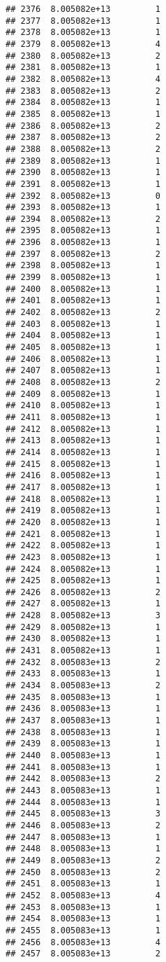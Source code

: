 \documentclass[
]{article}
\begin{document}
\begin{verbatim}
## 2376  8.005082e+13         1
## 2377  8.005082e+13         1
## 2378  8.005082e+13         1
## 2379  8.005082e+13         4
## 2380  8.005082e+13         2
## 2381  8.005082e+13         1
## 2382  8.005082e+13         4
## 2383  8.005082e+13         2
## 2384  8.005082e+13         1
## 2385  8.005082e+13         1
## 2386  8.005082e+13         2
## 2387  8.005082e+13         2
## 2388  8.005082e+13         2
## 2389  8.005082e+13         1
## 2390  8.005082e+13         1
## 2391  8.005082e+13         1
## 2392  8.005082e+13         0
## 2393  8.005082e+13         1
## 2394  8.005082e+13         2
## 2395  8.005082e+13         1
## 2396  8.005082e+13         1
## 2397  8.005082e+13         2
## 2398  8.005082e+13         1
## 2399  8.005082e+13         1
## 2400  8.005082e+13         1
## 2401  8.005082e+13         1
## 2402  8.005082e+13         2
## 2403  8.005082e+13         1
## 2404  8.005082e+13         1
## 2405  8.005082e+13         1
## 2406  8.005082e+13         1
## 2407  8.005082e+13         1
## 2408  8.005082e+13         2
## 2409  8.005082e+13         1
## 2410  8.005082e+13         1
## 2411  8.005082e+13         1
## 2412  8.005082e+13         1
## 2413  8.005082e+13         1
## 2414  8.005082e+13         1
## 2415  8.005082e+13         1
## 2416  8.005082e+13         1
## 2417  8.005082e+13         1
## 2418  8.005082e+13         1
## 2419  8.005082e+13         1
## 2420  8.005082e+13         1
## 2421  8.005082e+13         1
## 2422  8.005082e+13         1
## 2423  8.005082e+13         1
## 2424  8.005082e+13         1
## 2425  8.005082e+13         1
## 2426  8.005082e+13         2
## 2427  8.005082e+13         1
## 2428  8.005082e+13         3
## 2429  8.005082e+13         1
## 2430  8.005082e+13         1
## 2431  8.005082e+13         1
## 2432  8.005083e+13         2
## 2433  8.005083e+13         1
## 2434  8.005083e+13         2
## 2435  8.005083e+13         1
## 2436  8.005083e+13         1
## 2437  8.005083e+13         1
## 2438  8.005083e+13         1
## 2439  8.005083e+13         1
## 2440  8.005083e+13         1
## 2441  8.005083e+13         1
## 2442  8.005083e+13         2
## 2443  8.005083e+13         1
## 2444  8.005083e+13         1
## 2445  8.005083e+13         3
## 2446  8.005083e+13         2
## 2447  8.005083e+13         1
## 2448  8.005083e+13         1
## 2449  8.005083e+13         2
## 2450  8.005083e+13         2
## 2451  8.005083e+13         1
## 2452  8.005083e+13         4
## 2453  8.005083e+13         1
## 2454  8.005083e+13         1
## 2455  8.005083e+13         1
## 2456  8.005083e+13         4
## 2457  8.005083e+13         2

\end{verbatim}
\end{document}
